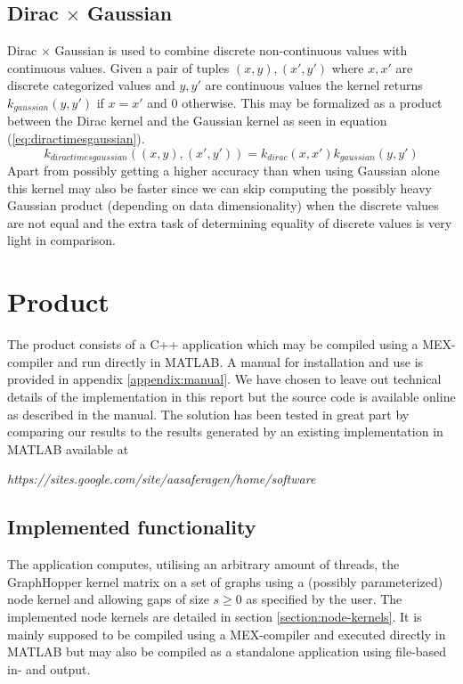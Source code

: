 \documentclass{article}
\begin{document}
\subsection{Dirac $\times$ Gaussian}
Dirac $\times$ Gaussian is used to combine discrete non-continuous values with continuous values. Given a pair of tuples $(x,y),(x',y')$ where $x,x'$ are discrete categorized values and $y,y'$ are continuous values the kernel returns $k_{gaussian}(y,y')$ if $x=x'$ and 0 otherwise. This may be formalized as a product between the Dirac kernel and the Gaussian kernel as seen in equation (\ref{eq:diractimesgaussian}).
\begin{equation}
\label{eq:diractimesgaussian}
k_{diractimesgaussian}((x,y), (x',y')) = k_{dirac}(x, x') k_{gaussian}(y, y')
\end{equation}
Apart from possibly getting a higher accuracy than when using Gaussian alone this kernel may also be faster since we can skip computing the possibly heavy Gaussian product (depending on data dimensionality) when the discrete values are not equal and the extra task of determining equality of discrete values is very light in comparison.

\section{Product}
The product consists of a C++ application which may be compiled using a MEX-compiler and run directly in MATLAB. A manual for installation and use is provided in appendix \ref{appendix:manual}. We have chosen to leave out technical details of the implementation in this report but the source code is available online as described in the manual. The solution has been tested in great part by comparing our results to the results generated by an existing implementation in MATLAB available at

\textit{https://sites.google.com/site/aasaferagen/home/software} 

\subsection{Implemented functionality}
The application computes, utilising an arbitrary amount of threads, the GraphHopper kernel matrix on a set of graphs using a (possibly parameterized) node kernel and allowing gaps of size $s\geq 0$ as specified by the user. The implemented node kernels are detailed in section \ref{section:node-kernels}. It is mainly supposed to be compiled using a MEX-compiler and executed directly in MATLAB but may also be compiled as a standalone application using file-based in- and output.
\end{document}
